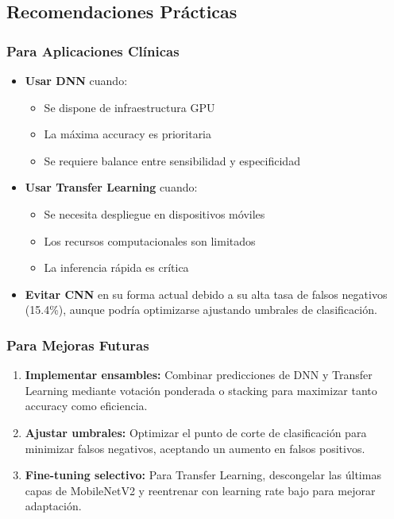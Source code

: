 \documentclass[11pt, a4paper]{article}
\begin{document}
\subsection{Recomendaciones Prácticas}

\subsubsection{Para Aplicaciones Clínicas}

\begin{itemize}
    \item \textbf{Usar DNN} cuando:
    \begin{itemize}
        \item Se dispone de infraestructura GPU
        \item La máxima accuracy es prioritaria
        \item Se requiere balance entre sensibilidad y especificidad
    \end{itemize}
    
    \item \textbf{Usar Transfer Learning} cuando:
    \begin{itemize}
        \item Se necesita despliegue en dispositivos móviles
        \item Los recursos computacionales son limitados
        \item La inferencia rápida es crítica
    \end{itemize}
    
    \item \textbf{Evitar CNN} en su forma actual debido a su alta tasa de falsos negativos (15.4\%), aunque podría optimizarse ajustando umbrales de clasificación.
\end{itemize}

\subsubsection{Para Mejoras Futuras}

\begin{enumerate}
    \item \textbf{Implementar ensambles:} Combinar predicciones de DNN y Transfer Learning mediante votación ponderada o stacking para maximizar tanto accuracy como eficiencia.
    
    \item \textbf{Ajustar umbrales:} Optimizar el punto de corte de clasificación para minimizar falsos negativos, aceptando un aumento en falsos positivos.
    
    \item \textbf{Fine-tuning selectivo:} Para Transfer Learning, descongelar las últimas capas de MobileNetV2 y reentrenar con learning rate bajo para mejorar adaptación.
\end{enumerate}
\end{document}
